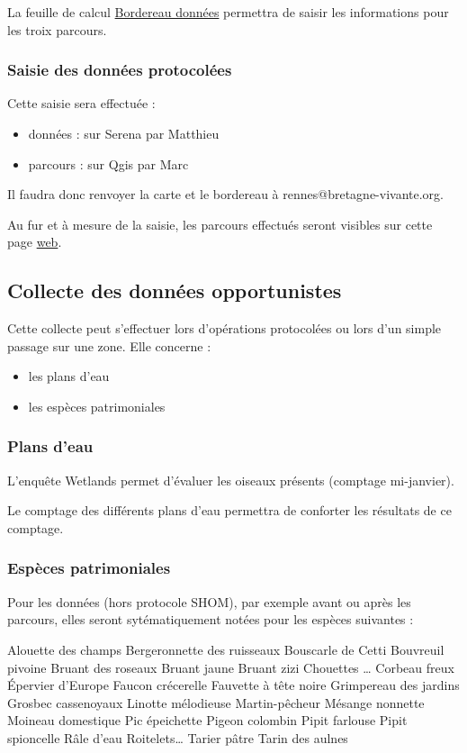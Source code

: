La feuille de calcul \href{https://drive.google.com/open?id=1TipmUPvPvoTlDldVDKbu0oJvzKWfrje2e-gMe-u-XCI}{Bordereau données} permettra de saisir les informations pour les troix parcours.


\subsubsection*{Saisie des données protocolées}
Cette saisie sera effectuée :
\begin{itemize}
\item données : sur Serena par Matthieu
\item parcours : sur Qgis par Marc
\end{itemize}
Il faudra donc renvoyer la carte et le bordereau à rennes@bretagne-vivante.org.

Au fur et à mesure de la saisie, les parcours effectués seront visibles sur cette page \href{http://bretagne-vivante-dev.org/bvo35rva/parcours.html}{web}.

\subsection*{Collecte des données opportunistes}
Cette collecte peut s'effectuer lors d'opérations protocolées ou lors d'un simple passage sur une zone. Elle concerne :
\begin{itemize}
\item les plans d'eau
\item les espèces patrimoniales
\end{itemize}
\subsubsection*{Plans d'eau}
L'enquête Wetlands permet d'évaluer les oiseaux présents (comptage mi-janvier).

Le comptage des différents plans d'eau permettra de conforter les résultats de ce comptage.

\subsubsection*{Espèces patrimoniales}
Pour les données (hors protocole SHOM), par exemple avant ou après les parcours, elles seront sytématiquement notées pour les espèces suivantes :

Alouette des champs
Bergeronnette des ruisseaux
Bouscarle de Cetti
Bouvreuil pivoine
Bruant des roseaux
Bruant jaune
Bruant zizi
Chouettes …
Corbeau freux
Épervier d'Europe
Faucon crécerelle
Fauvette à tête noire
Grimpereau des jardins
Grosbec cassenoyaux
Linotte mélodieuse
Martin-pêcheur
Mésange nonnette
Moineau domestique
Pic épeichette
Pigeon colombin
Pipit farlouse
Pipit spioncelle
Râle d'eau
Roitelets…
Tarier pâtre
Tarin des aulnes


